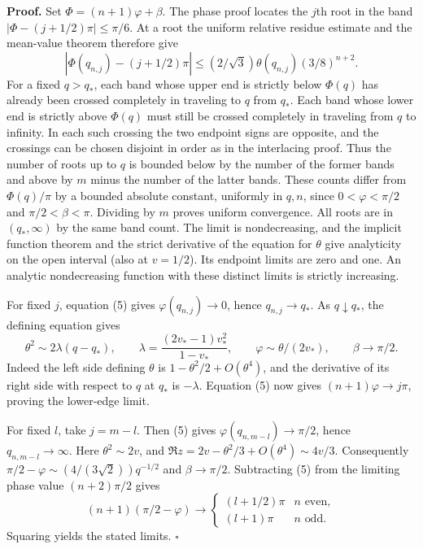\documentclass[11pt]{article}
\begin{document}
\textbf{Proof.} Set $\Phi=(n+1)\varphi+\beta$. The phase proof locates the $j$th root in the band $|\Phi-(j+1/2)\pi|\le\pi/6$. At a root the uniform relative residue estimate and the mean-value theorem therefore give
\[
|\Phi(q_{n,j})-(j+1/2)\pi|\le (2/\sqrt3)\theta(q_{n,j})(3/8)^{n+2}.
 \tag{5}
\]
For a fixed $q>q_*$, each band whose upper end is strictly below $\Phi(q)$ has already been crossed completely in traveling to $q$ from $q_*$. Each band whose lower end is strictly above $\Phi(q)$ must still be crossed completely in traveling from $q$ to infinity. In each such crossing the two endpoint signs are opposite, and the crossings can be chosen disjoint in order as in the interlacing proof. Thus the number of roots up to $q$ is bounded below by the number of the former bands and above by $m$ minus the number of the latter bands. These counts differ from $\Phi(q)/\pi$ by a bounded absolute constant, uniformly in $q,n$, since $0<\varphi<\pi/2$ and $\pi/2<\beta<\pi$. Dividing by $m$ proves uniform convergence. All roots are in $(q_*,\infty)$ by the same band count. The limit is nondecreasing, and the implicit function theorem and the strict derivative of the equation for $\theta$ give analyticity on the open interval (also at $v=1/2$). Its endpoint limits are zero and one. An analytic nondecreasing function with these distinct limits is strictly increasing.

For fixed $j$, equation (5) gives $\varphi(q_{n,j})\to0$, hence $q_{n,j}\to q_*$. As $q\downarrow q_*$, the defining equation gives
\[
\theta^2\sim 2\lambda(q-q_*),\qquad
 \lambda=\frac{(2v_*-1)v_*^2}{1-v_*},\qquad
 \varphi\sim\theta/(2v_*),\qquad \beta\to\pi/2.
\]
Indeed the left side defining $\theta$ is $1-\theta^2/2+O(\theta^4)$, and the derivative of its right side with respect to $q$ at $q_*$ is $-\lambda$. Equation (5) now gives $(n+1)\varphi\to j\pi$, proving the lower-edge limit.

For fixed $l$, take $j=m-l$. Then (5) gives $\varphi(q_{n,m-l})\to\pi/2$, hence $q_{n,m-l}\to\infty$. Here $\theta^2\sim2v$, and $\Re z=2v-\theta^2/3+O(\theta^4)\sim4v/3$. Consequently $\pi/2-\varphi\sim(4/(3\sqrt2))q^{-1/2}$ and $\beta\to\pi/2$. Subtracting (5) from the limiting phase value $(n+2)\pi/2$ gives
\[
(n+1)(\pi/2-\varphi)\longrightarrow
 \begin{cases}(l+1/2)\pi & n\text{ even},\\(l+1)\pi & n\text{ odd}.\end{cases}
\]
Squaring yields the stated limits. $\square$
\end{document}
